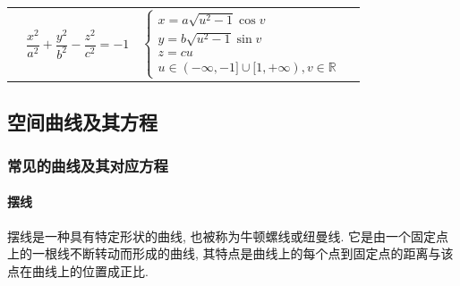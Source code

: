 \begin{table}[H]
{\begin{tabular}{l c | l l}
\begin{minipage}[b]{0.3\columnwidth}
        \end{minipage} & $\dfrac{x^2}{a^2}+\dfrac{y^2}{b^2}-\dfrac{z^2}{c^2}=-1$ & $\begin{cases}
            x=a\sqrt{u^2-1}\cos v\\y=b\sqrt{u^2-1}\sin v\\z=cu\\u\in(-\infty,-1]\cup[1,+\infty),v\in\mathbb{R}
        \end{cases}$
    \end{tabular}
    }
\end{table}

\subsection{空间曲线及其方程}

\subsubsection{常见的曲线及其对应方程}

\paragraph{摆线}

摆线是一种具有特定形状的曲线, 也被称为牛顿螺线或纽曼线. 
它是由一个固定点上的一根线不断转动而形成的曲线, 其特点是曲线上的每个点到固定点的距离与该点在曲线上的位置成正比. 

